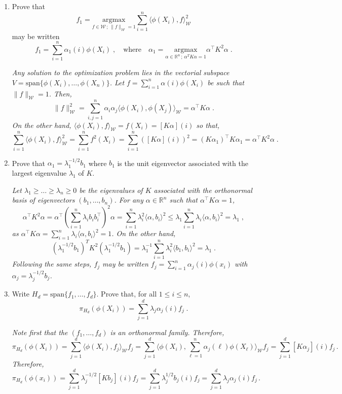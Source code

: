 \documentclass[a4paper,10pt,fleqn]{article}
\newcommand{\eqsp}{\,}
\newcommand{\rset}{\ensuremath{\mathbb{R}}}
\newcommand{\W}{\ensuremath{\mathcal{W}}}
\newcommand{\1}{\ensuremath{\mathbbm{1}}}
\newcommand{\bfK}{K}
\begin{document}
\begin{enumerate}
\item Prove that
$$
f_1 =  \underset{f\in \W\,;\,\|f\|_\W=1}{\mathrm{argmax}} \sum_{i=1}^n\langle \phi(X_i),f\rangle_\W^2
$$
may be written
$$
f_1 = \sum_{i=1}^n \alpha_1(i) \phi(X_i)\;,\quad\mbox{where}\quad \alpha_1 =  \underset{\alpha\in \rset^n\,;\, \alpha^T \bfK\alpha=1}{\mathrm{argmax}}\alpha^\top\bfK^2\alpha\;.
$$

\vspace{.2cm}

{\em
Any solution to the optimization problem lies in the vectorial subspace $V = \mathrm{span}\{\phi(X_i), \ldots,\phi(X_n)\}$.
Let $f = \sum_{i=1}^n \alpha(i)\phi(X_i)$ be such that $\|f\|_{\W}=1$. Then,
$$
\|f\|_{\W}^2 = \sum_{i,j=1}^n \alpha_i\alpha_j \langle \phi(X_i),\phi(X_j)\rangle_\W = \alpha^\top \bfK \alpha\;.
$$
On the other hand, $\langle \phi(X_i),f\rangle_\W = f(X_i) = [\bfK\alpha](i)$ so that,
$$
\sum_{i=1}^n\langle \phi(X_i),f\rangle_\W^2 = \sum_{i=1}^nf^2(X_i) = \sum_{i=1}^n  \left([\bfK\alpha](i)\right)^2 = (\bfK\alpha_1)^\top\bfK\alpha_1 = \alpha^\top \bfK^2 \alpha\;.
$$
}
\item Prove that $\alpha_1 = \lambda_1^{-1/2}b_1$ where $b_1$ is the unit eigenvector associated with the largest eigenvalue $\lambda_1$ of $\bfK$.

\vspace{.2cm}

{\em
Let $\lambda_1\geqslant\ldots\geqslant \lambda_n\ge 0$ be the eigenvalues of $\bfK$ associated with the orthonormal basis of eigenvectors $(b_1,\ldots,b_n)$. For any $\alpha\in\rset^n$ such that $\alpha^\top \bfK\alpha=1$,
$$
\alpha^\top \bfK^2 \alpha = \alpha^\top\left(\sum_{i=1}^n\lambda_i b_ib^\top_i\right)^2 \alpha = \sum_{i=1}^n \lambda_i^2 \langle \alpha,b_i\rangle^2 \leqslant \lambda_1\sum_{i=1}^n \lambda_i\langle \alpha,b_i\rangle^2= \lambda_1\;,
$$
as $\alpha^\top \bfK\alpha = \sum_{i=1}^n \lambda_i\langle \alpha,b_i\rangle^2 = 1$. On the other hand,
$$
\left(\lambda_1^{-1/2}b_1\right)^T \bfK^2 \left(\lambda_1^{-1/2}b_1\right) = \lambda_1^{-1}\sum_{i=1}^n \lambda_i^2 \langle b_1,b_i\rangle^2 = \lambda_1\;.
$$
Following the same steps, $f_j$ may be written $f_j = \sum_{i=1}^n \alpha_j(i)\phi(x_i)$ with $\alpha_j = \lambda^{-1/2}_jb_j$.
}
\item Write $H_d = \mathrm{span}\{f_1,\ldots,f_d\}$. Prove that, for all $1\leqslant i\leqslant n$,
$$
\pi_{H_d}(\phi(X_i)) = \sum_{j=1}^d \lambda_{j}\alpha_j(i)f_j\;.
$$

\vspace{.2cm}

{\em
Note first that the $(f_1,\ldots,f_d)$ is an orthonormal family. Therefore,
$$
\pi_{H_d}(\phi(X_i)) = \sum_{j=1}^d \langle \phi(X_i),f_j\rangle_{\W} f_j = \sum_{j=1}^d \langle \phi(X_i), \sum_{\ell=1}^n \alpha_j(\ell)\phi(X_{\ell})\rangle_{\W} f_j= \sum_{j=1}^d [\bfK\alpha_j](i)f_j\eqsp.
$$
Therefore,
$$
\pi_{H_d}(\phi(x_i)) = \sum_{j=1}^d \lambda^{-1/2}_j[\bfK b_j](i)f_j = \sum_{j=1}^d \lambda^{1/2}_jb_j(i)f_j =  \sum_{j=1}^d \lambda_{j}\alpha_j(i)f_j\eqsp.
$$
}
\end{enumerate}
\end{document}
